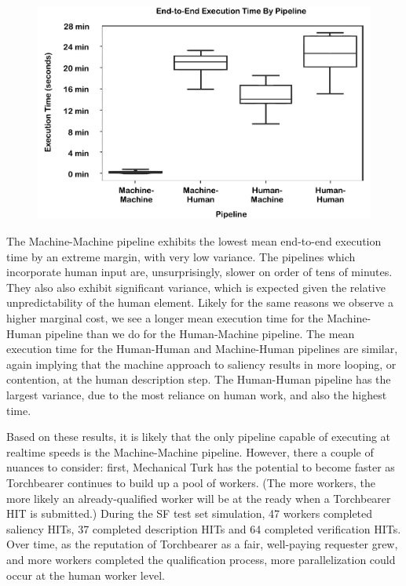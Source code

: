 \begin{figure}[htbp]
  \centering
  \includegraphics[width=\textwidth]{images/plot_executiontime.pdf}
  \caption{}
  \label{fig:plot:executiontime}
\end{figure}

The Machine-Machine pipeline exhibits the lowest mean end-to-end execution time by an extreme margin, with very low variance. The pipelines which incorporate human input are, unsurprisingly, slower on order of tens of minutes. They also also exhibit significant variance, which is expected given the relative unpredictability of the human element. Likely for the same reasons we observe a higher marginal cost, we see a longer mean execution time for the Machine-Human pipeline than we do for the Human-Machine pipeline. The mean execution time for the Human-Human and Machine-Human pipelines are similar, again implying that the machine approach to saliency results in more looping, or contention, at the human description step. The Human-Human pipeline has the largest variance, due to the most reliance on human work, and also the highest time. 

Based on these results, it is likely that the only pipeline capable of executing at realtime speeds is the Machine-Machine pipeline. However, there a couple of nuances to consider: first, Mechanical Turk has the potential to become faster as Torchbearer continues to build up a pool of workers. (The more workers, the more likely an already-qualified worker will be at the ready when a Torchbearer HIT is submitted.) During the SF test set simulation, 47 workers completed saliency HITs, 37 completed description HITs and 64 completed verification HITs. Over time, as the reputation of Torchbearer as a fair, well-paying requester grew, and more workers completed the qualification process, more parallelization could occur at the human worker level.

